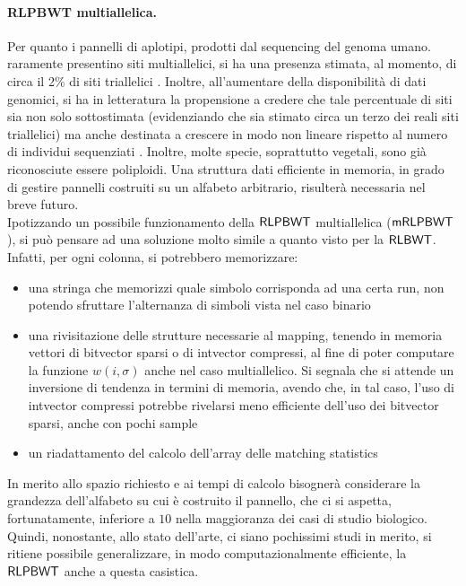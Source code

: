\paragraph{RLPBWT multiallelica.}
Per quanto i pannelli di aplotipi, prodotti dal sequencing del genoma umano.
raramente presentino siti multiallelici, si ha una presenza stimata, al momento,
di circa il 2\% di siti triallelici \cite{tri}. Inoltre, all'aumentare della
disponibilità di dati genomici, si ha in letteratura la propensione a credere
che tale percentuale di siti sia non solo sottostimata (evidenziando che sia
stimato 
circa un terzo dei reali siti triallelici) ma anche destinata a
crescere in modo non lineare rispetto al numero di individui sequenziati
\cite{tri2}. Inoltre, molte specie, soprattutto vegetali, sono già riconosciute
essere poliploidi. Una struttura dati efficiente in memoria, in grado di
gestire pannelli costruiti su un alfabeto arbitrario, risulterà necessaria nel
breve futuro.\\
Ipotizzando un possibile funzionamento della $\mbox{\rm {\sf RLPBWT}}$
multiallelica ($\mbox{\rm {\sf mRLPBWT}}$), si può pensare ad una soluzione molto
simile a quanto visto per la $\mbox{\rm {\sf RLBWT}}$. Infatti, per ogni colonna, si
potrebbero memorizzare:
\begin{itemize}
  \item una stringa che memorizzi quale simbolo corrisponda ad una certa run,
  non potendo sfruttare l'alternanza di simboli vista nel caso binario
  \item una rivisitazione delle strutture necessarie al mapping, tenendo in
  memoria vettori di bitvector sparsi o di intvector compressi, al fine di poter
  computare la funzione $w(i,\sigma)$ anche nel caso multiallelico. Si segnala
  che si attende un inversione di 
  tendenza in termini di memoria, avendo che, in tal caso, l'uso di intvector
  compressi potrebbe rivelarsi meno efficiente dell'uso dei bitvector sparsi,
  anche con pochi sample
  \item un riadattamento del calcolo dell'array delle matching statistics 
\end{itemize}
In merito allo spazio richiesto e ai tempi di calcolo bisognerà considerare la
grandezza dell'alfabeto su cui è costruito il pannello, che ci si aspetta,
fortunatamente, 
inferiore a $10$ nella maggioranza dei casi di studio biologico.\\
Quindi, nonostante, allo stato dell'arte, ci siano pochissimi studi in merito,
si ritiene 
possibile generalizzare, in modo computazionalmente efficiente, la
$\mbox{\rm {\sf RLPBWT}}$ anche a questa casistica. 
